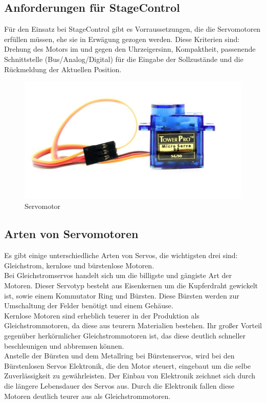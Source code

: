 \subsection{Anforderungen für StageControl}
Für den Einsatz bei StageControl gibt es Vorraussetzungen, die die Servomotoren erfüllen müssen, ehe sie in Erwägung gezogen werden. Diese Kriterien sind: Drehung des Motors im und gegen den Uhrzeigersinn, Kompaktheit, passenende Schnittstelle (Bus/Analog/Digital) für die Eingabe der Sollzustände und die Rückmeldung der Aktuellen Position.

\begin{figure}[H]
	\centering
	\includegraphics[width=0.7\linewidth]{images/servo.jpg}
	\caption[Servomotor]{Servomotor}
	\label{fig:Servo}
\end{figure}

\subsection{Arten von Servomotoren}
Es gibt einige unterschiedliche Arten von Servos, die wichtigsten drei sind: Gleichstrom, kernlose und bürstenlose Motoren. \\
Bei Gleichstromservos handelt sich um die billigste und gängiste Art der Motoren. Dieser Servotyp besteht aus Eisenkernen um die Kupferdraht gewickelt ist, sowie einem Kommutator Ring und Bürsten. Diese Bürsten werden zur Umschaltung der Felder benötigt und einem Gehäuse. \\
Kernlose Motoren sind erheblich teuerer in der Produktion als Gleichstrommotoren, da diese aus teurern Materialien bestehen. Ihr großer Vorteil gegenüber herkörmlicher Gleichstrommotoren ist, das diese deutlich schneller beschleunigen und abbremsen können. \\
Anstelle der Bürsten und dem Metallring bei Bürstenservos, wird bei den Bürstenlosen Servos Elektronik, die den Motor steuert, eingebaut um die selbe Zuverlässigkeit zu gewährleisten. Der Einbau von Elektronik zeichnet sich durch die längere Lebensdauer des Servos aus. Durch die Elektronik fallen diese Motoren deutlich teurer aus als Gleichstrommotoren. \\
\cite{Servomotor_Arten}


